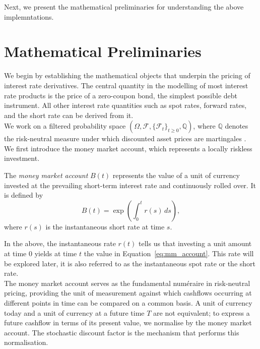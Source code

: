     \noindent
    Next, we present the mathematical preliminaries for understanding the above implemntations. 
 
\newpage
\section{Mathematical Preliminaries}                                           
    We begin by establishing the mathematical objects that underpin the pricing of interest rate derivatives. The central quantity in the modelling of most interest rate products is the price of a zero-coupon bond, the simplest possible debt instrument. All other interest rate quantities such as spot rates, forward rates, and the short rate can be derived from it. \\             

    \noindent                                                                            
    We work on a filtered probability space $(\Omega, \mathcal{F}, \{\mathcal{F}_t\}_{t \geq 0}, \mathbb{Q})$, where $\mathbb{Q}$ denotes the risk-neutral measure under which discounted asset prices are martingales \cite{BrigoMercurio2006}. We first introduce the money market account, which represents a locally riskless investment.
    
    \begin{definition}
    The \textit{money market account} $B(t)$ represents the value of a unit of currency invested at the prevailing short-term interest rate and continuously rolled over. It is defined by
    \begin{equation}\label{eq:mm_account}
      B(t) = \exp\left(\int_0^t r(s) \, ds\right),
    \end{equation}
    where $r(s)$ is the instantaneous short rate at time $s$.
    \end{definition}

    \noindent
    In the above, the instantaneous rate $r(t)$ tells us that investing a unit amount at time $0$ yields at time $t$ the value in Equation~\eqref{eq:mm_account}. This rate will be explored later, it is also referred to as the instantaneous spot rate or the short rate.\\
    
    \noindent
    The money market account serves as the fundamental num\'{e}raire in risk-neutral pricing, providing the unit of measurement against which cashflows occurring at different points in time can be compared on a common basis. A unit of currency today and a unit of currency at a future time $T$ are not equivalent; to express a future cashflow in terms of its present value, we normalise by the money market account. The stochastic discount factor is the mechanism that performs this normalisation.
    
